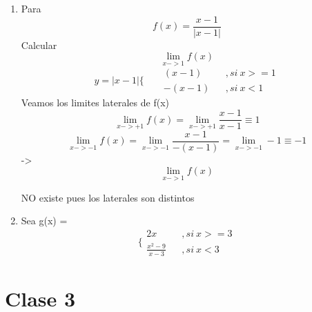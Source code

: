 \documentclass{article}
\begin{document}
            \begin{enumerate}
                \item Para \begin{equation}
                    f(x) = \frac{x-1}{|x-1|}
                \end{equation} Calcular
                \begin{equation}
                    \lim_{x->1} f(x)
                \end{equation} 
                \begin{equation}
                    y=|x-1| \Biggl\{ 
                    \begin{aligned}
                          && (x-1) && ,si\ x>=1 \\ 
                          &&-(x-1) &&,si\ x<1
                    \end{aligned}
                \end{equation} Veamos los limites laterales de f(x)
                \begin{equation}
                    \lim_{x->+1}f(x)=\lim_{x->+1} \frac{x-1}{x-1} \equiv 1
                \end{equation}
                \begin{equation}
                    \lim_{x->-1}f(x)=\lim_{x->-1} \frac{x-1}{-(x-1)} = \lim_{x->-1} -1 \equiv -1
                \end{equation}
                -> \begin{equation}
                    \lim_{x->1} f(x)
                \end{equation} \begin{center}
                    NO existe pues los laterales son distintos
                \end{center}
                \item Sea g(x) = \begin{equation}
                    \biggl\{\begin{aligned}
                        2x && ,si\ x>=3 \\ 
                        \frac{x^2 -9}{x-3} &&,si\ x<3 
                    \end{aligned}
                \end{equation}
            \end{enumerate}
    \section{Clase 3}
    
           
          
        
\end{document}
